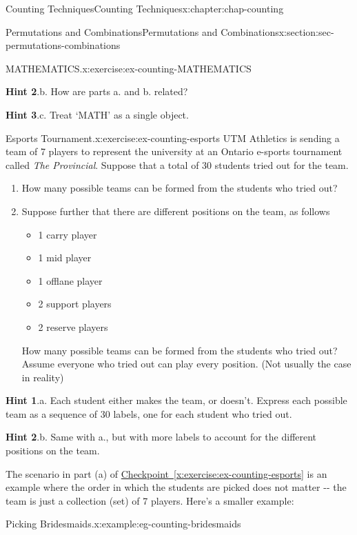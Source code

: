\documentclass[oneside,10pt,]{book}
\newcommand{\blocktitlefont}{\relax}
\newcommand{\xreffont}{\relax}
\numberwithin{equation}{section}
\begin{document}
\begin{chapterptx}{Counting Techniques}{}{Counting Techniques}{}{}{x:chapter:chap-counting}
\begin{sectionptx}{Permutations and Combinations}{}{Permutations and Combinations}{}{}{x:section:sec-permutations-combinations}
\begin{inlineexercise}{MATHEMATICS.}{x:exercise:ex-counting-MATHEMATICS}
\par\smallskip%
\noindent\textbf{\blocktitlefont Hint 2}.\hypertarget{g:hint:id226956}{}\quad{}b. How are parts a. and b. related?%
\par\smallskip%
\noindent\textbf{\blocktitlefont Hint 3}.\hypertarget{g:hint:id226966}{}\quad{}c. Treat `MATH' as a single object.%
\end{inlineexercise}
\begin{inlineexercise}{Esports Tournament.}{x:exercise:ex-counting-esports}%
UTM Athletics is sending a team of 7 players to represent the university at an Ontario e-sports tournament called \emph{The Provincial}. Suppose that a total of 30 students tried out for the team.%
\begin{enumerate}[label=(\alph*)]
\item{}How many possible teams can be formed from the students who tried out?%
\item{}Suppose further that there are different positions on the team, as follows%
\begin{itemize}[label=\textbullet]
\item{}1 carry player%
\item{}1 mid player%
\item{}1 offlane player%
\item{}2 support players%
\item{}2 reserve players%
\end{itemize}
How many possible teams can be formed from the students who tried out? Assume everyone who tried out can play every position. (Not usually the case in reality\textellipsis{})%
\end{enumerate}
%
\par\smallskip%
\noindent\textbf{\blocktitlefont Hint 1}.\hypertarget{g:hint:id227172}{}\quad{}a. Each student either makes the team, or doesn't. Express each possible team as a sequence of 30 labels, one for each student who tried out.%
\par\smallskip%
\noindent\textbf{\blocktitlefont Hint 2}.\hypertarget{g:hint:id227190}{}\quad{}b. Same with a., but with more labels to account for the different positions on the team.%
\end{inlineexercise}
The scenario in part (a) of \hyperref[x:exercise:ex-counting-esports]{Checkpoint~{\xreffont\ref{x:exercise:ex-counting-esports}}} is an example where the order in which the students are picked does not matter -{}-{} the team is just a collection (set) of 7 players. Here's a smaller example:%
\begin{example}{Picking Bridesmaids.}{x:example:eg-counting-bridesmaids}%

\end{example}
\end{sectionptx}
\end{chapterptx}
\end{document}
